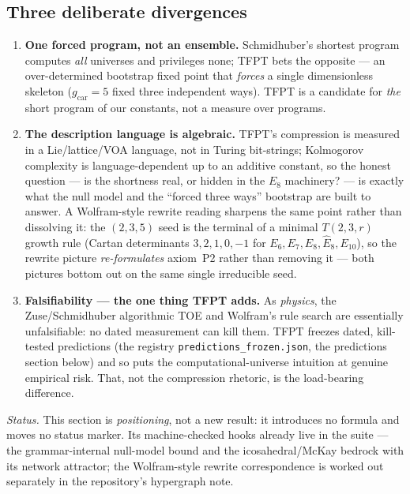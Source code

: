 \subsection*{Three deliberate divergences}
\begin{enumerate}[leftmargin=1.6em,itemsep=2pt,topsep=2pt,label=\textbf{(\Alph*)}]
\item \textbf{One forced program, not an ensemble.} Schmidhuber's shortest program
      computes \emph{all} universes and privileges none; TFPT bets the opposite --- an
      over-determined bootstrap fixed point that \emph{forces} a single dimensionless
      skeleton ($g_{\mathrm{car}}{=}5$ fixed three independent ways). TFPT is a candidate
      for \emph{the} short program of our constants, not a measure over programs.
\item \textbf{The description language is algebraic.} TFPT's compression is measured in a
      Lie/lattice/VOA language, not in Turing bit-strings; Kolmogorov complexity is
      language-dependent up to an additive constant, so the honest question --- is the
      shortness real, or hidden in the $E_8$ machinery? --- is exactly what the null model
      and the ``forced three ways'' bootstrap are built to answer. A Wolfram-style rewrite
      reading sharpens the same point rather than dissolving it: the $(2,3,5)$ seed is the
      terminal of a minimal $T(2,3,r)$ growth rule (Cartan determinants $3,2,1,0,-1$ for
      $E_6,E_7,E_8,\hat E_8,E_{10}$), so the rewrite picture \emph{re-formulates}
      axiom~P2 rather than removing it --- both pictures bottom out on the same single
      irreducible seed.
\item \textbf{Falsifiability --- the one thing TFPT adds.} As \emph{physics}, the
      Zuse/Schmidhuber algorithmic TOE and Wolfram's rule search are essentially
      unfalsifiable: no dated measurement can kill them. TFPT freezes dated, kill-tested
      predictions (the registry \texttt{predictions\_frozen.json}, the predictions section
      below) and so puts the computational-universe intuition at genuine empirical risk.
      That, not the compression rhetoric, is the load-bearing difference.
\end{enumerate}

\noindent\emph{Status.} This section is \emph{positioning}, not a new result: it
introduces no formula and moves no status marker. Its machine-checked hooks already live
in the suite --- the grammar-internal null-model bound and the icosahedral/McKay bedrock
with its network attractor; the Wolfram-style rewrite correspondence is worked out
separately in the repository's hypergraph note.

